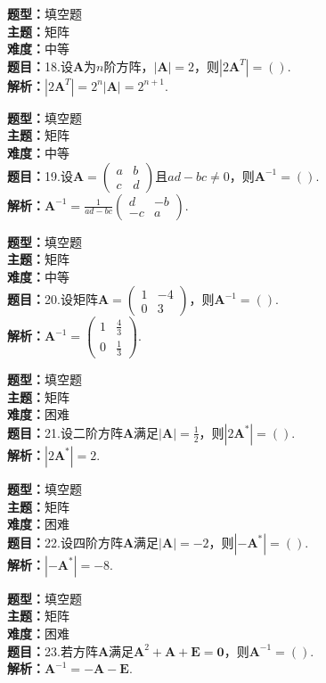 \documentclass{ctexart}
\newenvironment{question}[5]{%
	\noindent\textbf{题型：}#1\\
	\textbf{主题：}#2\\
	\textbf{难度：}#3\\
	\textbf{题目：}#4\\
	\textbf{解析：}#5\\
	\vspace{1em}
}{}
\begin{document}
	\begin{question}
		{填空题}
		{矩阵}
		{中等}
		{18.设\(\mathbf{A}\)为\(n\)阶方阵，\(|\mathbf{A}|=2\)，则\(\left|2\mathbf{A}^T\right|=()\). }
		{\(\left|2\mathbf{A}^T\right|=2^n|\mathbf{A}|=2^{n+1}\). }
	\end{question}
	
	\begin{question}
		{填空题}
		{矩阵}
		{中等}
		{19.设\(\mathbf{A}=\left(\begin{array}{ll}a & b \\ c & d\end{array}\right)\)且\(ad-bc\neq0\)，则\(\mathbf{A}^{-1}=()\). }
		{\(\mathbf{A}^{-1}=\frac{1}{ad-bc}\left(\begin{array}{rr}d & -b \\ -c & a\end{array}\right)\). }
	\end{question}
	
	\begin{question}
		{填空题}
		{矩阵}
		{中等}
		{20.设矩阵\(\mathbf{A}=\left(\begin{array}{cc}1 & -4 \\ 0 & 3\end{array}\right)\)，则\(\mathbf{A}^{-1}=()\). }
		{\(\mathbf{A}^{-1}=\left(\begin{array}{cc}1 & \frac{4}{3} \\ 0 & \frac{1}{3}\end{array}\right)\). }
	\end{question}
	
	\begin{question}
		{填空题}
		{矩阵}
		{困难}
		{21.设二阶方阵\(\mathbf{A}\)满足\(|\mathbf{A}|=\frac{1}{2}\)，则\(\left|2\mathbf{A}^*\right|=()\). }
		{\(\left|2\mathbf{A}^*\right|=2\). }
	\end{question}
	
	\begin{question}
		{填空题}
		{矩阵}
		{困难}
		{22.设四阶方阵\(\mathbf{A}\)满足\(|\mathbf{A}|=-2\)，则\(\left|-\mathbf{A}^*\right|=()\). }
		{\(\left|-\mathbf{A}^*\right|=-8\). }
	\end{question}
	
	\begin{question}
		{填空题}
		{矩阵}
		{困难}
		{23.若方阵\(\mathbf{A}\)满足\(\mathbf{A}^2+\mathbf{A}+\mathbf{E}=\mathbf{0}\)，则\(\mathbf{A}^{-1}=()\). }
		{\(\mathbf{A}^{-1}=-\mathbf{A}-\mathbf{E}\). }
	\end{question}
	
\end{document}
